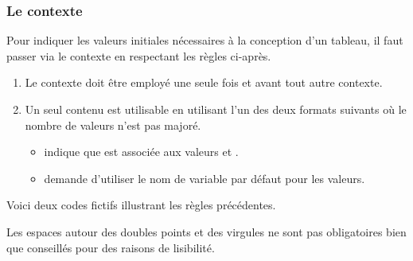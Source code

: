 \documentclass[10pt, a4paper]{article}
\begin{document}

\subsubsection{Le contexte }
\label{tns-math-functab-ctxt-bounds}

Pour indiquer les valeurs initiales nécessaires à la conception d'un tableau, il faut passer via le contexte  en respectant les règles ci-après.
\begin{enumerate}
    \item Le contexte  doit être employé une seule fois et avant tout autre contexte.


    \item Un seul contenu est utilisable en utilisant l'un des deux formats suivants où le nombre de valeurs n'est pas majoré.
    \begin{itemize}
        \item {} indique que  est associée aux valeurs  et  .

        \item {} demande d'utiliser le nom de variable par défaut pour les valeurs.
    \end{itemize}
\end{enumerate}


\medskip


Voici deux codes fictifs illustrant les règles précédentes.

\begin{multicols}{2}

\end{multicols}




\begin{tdocnote}
    Les espaces autour des doubles points et des virgules ne sont pas obligatoires bien que conseillés pour des raisons de lisibilité.
\end{tdocnote}
\end{document}
